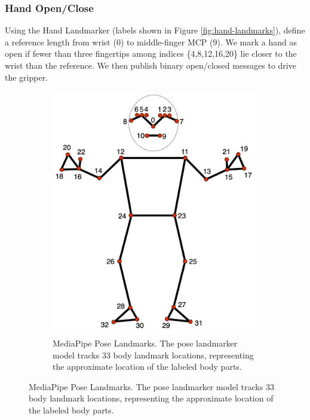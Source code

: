 \documentclass[acmsmall, screen]{acmart}
\begin{document}
\subsubsection{Hand Open/Close}
Using the Hand Landmarker (labels shown in Figure \ref{fig:hand-landmarks}), define a reference length from wrist (0) to middle-finger MCP (9). We mark a hand as open if fewer than three fingertips among indices \{4,8,12,16,20\} lie closer to the wrist than the reference. We then publish binary open/closed messages to drive the gripper.

\begin{figure}[htbp]
  \centering
  \begin{subfigure}[b]{0.45\linewidth}
    \centering
    \includegraphics[width=\linewidth]{assets/pose-landmarks.png}
    \caption{MediaPipe Pose Landmarks. The pose landmarker model tracks 33 body landmark locations, representing the approximate location of the labeled body parts.}
    \label{fig:pose-landmarks}
  \end{subfigure}

\end{figure}
\end{document}
